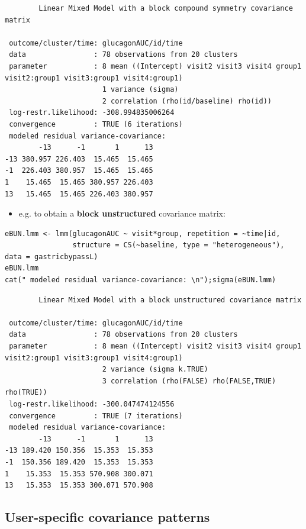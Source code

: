 \documentclass[12pt]{article}
\begin{document}
\begin{verbatim}
		Linear Mixed Model with a block compound symmetry covariance matrix 

 outcome/cluster/time: glucagonAUC/id/time 
 data                : 78 observations from 20 clusters 
 parameter           : 8 mean ((Intercept) visit2 visit3 visit4 group1 visit2:group1 visit3:group1 visit4:group1) 
                       1 variance (sigma) 
                       2 correlation (rho(id/baseline) rho(id)) 
 log-restr.likelihood: -308.994835006264 
 convergence         : TRUE (6 iterations)
 modeled residual variance-covariance: 
        -13      -1       1      13
-13 380.957 226.403  15.465  15.465
-1  226.403 380.957  15.465  15.465
1    15.465  15.465 380.957 226.403
13   15.465  15.465 226.403 380.957
\end{verbatim}

\begin{itemize}
\item e.g. to obtain a \textbf{block unstructured} covariance matrix:
\end{itemize}
\lstset{language=r,label= ,caption= ,captionpos=b,numbers=none}
\begin{lstlisting}
eBUN.lmm <- lmm(glucagonAUC ~ visit*group, repetition = ~time|id,
                structure = CS(~baseline, type = "heterogeneous"), data = gastricbypassL)
eBUN.lmm
cat(" modeled residual variance-covariance: \n");sigma(eBUN.lmm)
\end{lstlisting}

\begin{verbatim}
		Linear Mixed Model with a block unstructured covariance matrix 

 outcome/cluster/time: glucagonAUC/id/time 
 data                : 78 observations from 20 clusters 
 parameter           : 8 mean ((Intercept) visit2 visit3 visit4 group1 visit2:group1 visit3:group1 visit4:group1) 
                       2 variance (sigma k.TRUE) 
                       3 correlation (rho(FALSE) rho(FALSE,TRUE) rho(TRUE)) 
 log-restr.likelihood: -300.047474124556 
 convergence         : TRUE (7 iterations)
 modeled residual variance-covariance: 
        -13      -1       1      13
-13 189.420 150.356  15.353  15.353
-1  150.356 189.420  15.353  15.353
1    15.353  15.353 570.908 300.071
13   15.353  15.353 300.071 570.908
\end{verbatim}

\clearpage

\subsection{User-specific covariance patterns}
\label{sec:orgf0176ab}
\end{document}
